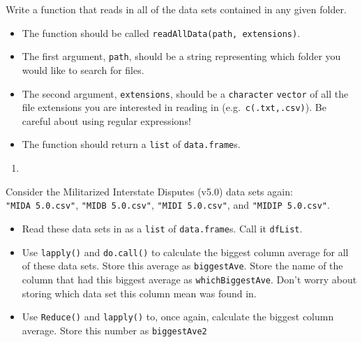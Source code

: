 \documentclass[
  12pt,
  krantz2]{krantz}
\providecommand{\tightlist}{%
  \setlength{\itemsep}{0pt}\setlength{\parskip}{0pt}}
\begin{document}
Write a function that reads in all of the data sets contained in any given folder.

\begin{itemize}
\tightlist
\item
  The function should be called \texttt{readAllData(path,\ extensions)}.
\item
  The first argument, \texttt{path}, should be a string representing which folder you would like to search for files.
\item
  The second argument, \texttt{extensions}, should be a \texttt{character} \texttt{vector} of all the file extensions you are interested in reading in (e.g.~\texttt{c(\textquotesingle{}.txt\textquotesingle{},\textquotesingle{}.csv\textquotesingle{})}). Be careful about using regular expressions!
\item
  The function should return a \texttt{list} of \texttt{data.frame}s.
\end{itemize}

\begin{enumerate}
\def\labelenumi{\arabic{enumi}.}
\setcounter{enumi}{2}
\tightlist
\item
\end{enumerate}

Consider the Militarized Interstate Disputes (v5.0) \citep{mid5} data sets again: \texttt{"MIDA\ 5.0.csv"}, \texttt{"MIDB\ 5.0.csv"}, \texttt{"MIDI\ 5.0.csv"}, and \texttt{"MIDIP\ 5.0.csv"}.

\begin{itemize}
\tightlist
\item
  Read these data sets in as a \texttt{list} of \texttt{data.frame}s. Call it \texttt{dfList}.
\item
  Use \texttt{lapply()} and \texttt{do.call()} to calculate the biggest column average for all of these data sets. Store this average as \texttt{biggestAve}. Store the name of the column that had this biggest average as \texttt{whichBiggestAve}. Don't worry about storing which data set this column mean was found in.
\item
  Use \texttt{Reduce()} and \texttt{lapply()} to, once again, calculate the biggest column average. Store this number as \texttt{biggestAve2}
\end{itemize}

  

\backmatter
\printindex
\end{document}
